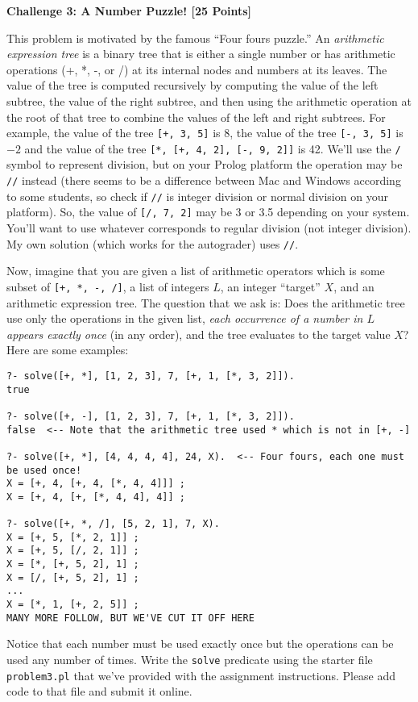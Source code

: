 \documentclass[12pt]{article}
\newcommand{\Problem}[3]{\mbox{} \newline \noindent \textbf{\textbf{Challenge #1: #2 [#3 Points] \\ }}}
\begin{document}
\Problem{3}{A Number Puzzle!}{25}

This problem is motivated by the famous ``Four fours puzzle.''
An \emph{arithmetic expression tree} is a binary tree that is either a single number or has arithmetic operations (+, *, -, or /) at its internal nodes and numbers at its leaves.
The value of the tree is computed recursively by computing the value of the left subtree, the value of the right subtree, and then using the arithmetic operation at the root of that tree to combine the values of the left and right subtrees.  For example, the value of the tree \verb![+, 3, 5]! is 8, the value of the tree \verb![-, 3, 5]! is $-2$ and the value of the tree 
\verb![*, [+, 4, 2], [-, 9, 2]]! is 42.  We'll use the \verb+/+ symbol to represent division, but on your Prolog platform the operation may be \verb!//! instead (there seems to be a difference between Mac and Windows according to some students, so check if \verb+//+ is integer division or normal division on your platform). So, the value of \verb![/, 7, 2]! may be 3 or 3.5 depending on your system. You'll want to use whatever corresponds to regular division (not integer division). My own solution (which works for the autograder) uses \verb+//+.

Now, imagine that you are given a list of arithmetic operators which is some subset of \verb![+, *, -, /]!, a list of integers $L$, an integer ``target'' $X$, and an arithmetic expression tree.  The question that we ask is:  Does the arithmetic tree use only the operations in the given list, \emph{each occurrence of a number in $L$ appears exactly once} (in any order), and the tree evaluates to the target value $X$?
Here are some examples:
\begin{verbatim}
?- solve([+, *], [1, 2, 3], 7, [+, 1, [*, 3, 2]]).
true 

?- solve([+, -], [1, 2, 3], 7, [+, 1, [*, 3, 2]]).
false  <-- Note that the arithmetic tree used * which is not in [+, -] 

?- solve([+, *], [4, 4, 4, 4], 24, X).  <-- Four fours, each one must be used once!
X = [+, 4, [+, 4, [*, 4, 4]]] ;
X = [+, 4, [+, [*, 4, 4], 4]] ;

?- solve([+, *, /], [5, 2, 1], 7, X).
X = [+, 5, [*, 2, 1]] ;
X = [+, 5, [/, 2, 1]] ;
X = [*, [+, 5, 2], 1] ;  
X = [/, [+, 5, 2], 1] ;
...
X = [*, 1, [+, 2, 5]] ; 
MANY MORE FOLLOW, BUT WE'VE CUT IT OFF HERE
\end{verbatim}

Notice that each number must be used exactly once but the operations can be used any number of times.  Write the \verb+solve+ predicate using the starter file \verb+problem3.pl+ that we've provided with the assignment instructions.  Please add code to that file and submit it online.
\end{document}
